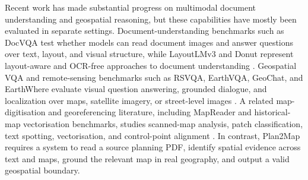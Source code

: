 \documentclass[11pt]{article}
\begin{document}
Recent work has made substantial progress on multimodal document understanding and geospatial reasoning, but these capabilities have mostly been evaluated in separate settings. Document-understanding benchmarks such as DocVQA test whether models can read document images and answer questions over text, layout, and visual structure, while LayoutLMv3 and Donut represent layout-aware and OCR-free approaches to document understanding \citep{mathew2021docvqa,huang2022layoutlmv3,kim2022donut}. Geospatial VQA and remote-sensing benchmarks such as RSVQA, EarthVQA, GeoChat, and EarthWhere evaluate visual question answering, grounded dialogue, and localization over maps, satellite imagery, or street-level images \citep{lobry2020rsvqa,wang2024earthvqa,kuckreja2024geochat,qian2025earthwhere}. A related map-digitisation and georeferencing literature, including MapReader and historical-map vectorisation benchmarks, studies scanned-map analysis, patch classification, text spotting, vectorisation, and control-point alignment \citep{wood2024mapreader,chen2024historicalmapvectorization}. In contrast, Plan2Map requires a system to read a source planning PDF, identify spatial evidence across text and maps, ground the relevant map in real geography, and output a valid geospatial boundary.

\end{document}
